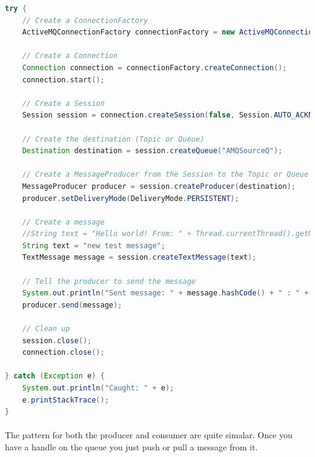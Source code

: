 \documentclass[
10pt, %
letterpaper, %
oneside, %
headinclude,footinclude, %
BCOR5mm, %
]{scrartcl}
\begin{document}
\begin{lstlisting}[language=Java]
try {
	// Create a ConnectionFactory
	ActiveMQConnectionFactory connectionFactory = new ActiveMQConnectionFactory("tcp://opmq1.outsmartinc.com:61616");

	// Create a Connection
	Connection connection = connectionFactory.createConnection();
	connection.start();

	// Create a Session
	Session session = connection.createSession(false, Session.AUTO_ACKNOWLEDGE);

	// Create the destination (Topic or Queue)
	Destination destination = session.createQueue("AMQSourceQ");

	// Create a MessageProducer from the Session to the Topic or Queue
	MessageProducer producer = session.createProducer(destination);
	producer.setDeliveryMode(DeliveryMode.PERSISTENT);

	// Create a message
	//String text = "Hello world! From: " + Thread.currentThread().getName() + " : " + this.hashCode();
	String text = "new test message";
	TextMessage message = session.createTextMessage(text);

	// Tell the producer to send the message
	System.out.println("Sent message: " + message.hashCode() + " : " + Thread.currentThread().getName());
	producer.send(message);

	// Clean up
	session.close();
	connection.close();
	
} catch (Exception e) {
	System.out.println("Caught: " + e);
	e.printStackTrace();
}
\end{lstlisting}

\paragraph{}
The pattern for both the producer and consumer are quite simalar. Once you have a handle on the queue you just push or pull a message from it.
\end{document}
